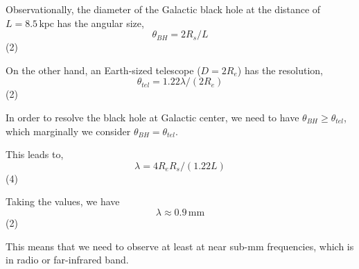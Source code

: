 Observationally, the diameter of the Galactic black hole at the distance of
$L = 8.5\,\mathrm{kpc}$ has the angular size,
\[
\theta_{BH} = 2R_s/L
\]
\hfill(2)

On the other hand, an Earth-sized telescope ($D = 2R_e$) has the resolution,
\[
\theta_{tel} = 1.22\lambda/(2R_e)
\]
\hfill(2)

In order to resolve the black hole at Galactic center, we need to have
$\theta_{BH} \geq \theta_{tel}$, which marginally we consider
$\theta_{BH} = \theta_{tel}$.

This leads to,
\[
\lambda = 4R_e R_s/(1.22L)
\]
\hfill(4)

Taking the values, we have
\[
\lambda \approx 0.9\,\mathrm{mm}
\]
\hfill(2)

This means that we need to observe at least at near sub-mm frequencies, which
is in radio or far-infrared band.
